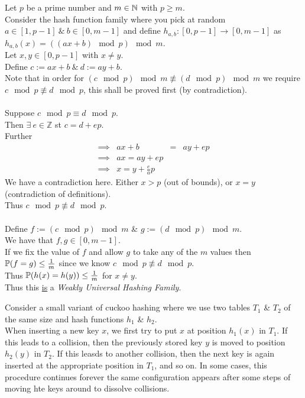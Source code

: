 \documentclass[11pt,a4paper]{article}
\begin{document}
\qpart
Let $p$ be a prime number and $m\in\mathbb{N}$ with $p\geq m$.\\
Consider the hash function family where you pick at random $a\in[1,p-1]\ \&\ b\in[0,m-1]$ and define $h_{a,b}:[0,p-1]\to[0,m-1]$ as $h_{a,b}(x)=((ax+b)\mod p)\mod m$.\\

\apart
Let $x,y\in[0,p-1]$ with $x\neq y$.\\
Define $c:=ax+b\ \&\ d:=ay+b$.\\
Note that in order for $(c\mod p)\mod m\not\equiv(d\mod p)\mod m$ we require ${c\mod p\not\equiv d\mod p}$, this shall be proved first (by contradiction).\\
\\
Suppose $c\mod p\equiv d\mod p$.\\
Then $\exists\ e\in\mathbb{Z}$ st $c=d+ep$.\\
Further
\[\begin{array}{rrcl}
\implies&ax+b&=&ay+ep\\
\implies&ax=ay+ep\\
\implies&x=y+\frac{e}{a}p
\end{array}\]
We have a contradiction here. Either $x>p$ (out of bounds), or $x=y$ (contradiction of definitions).\\
Thus $c\mod p\not\equiv d\mod p$.\\
\\
Define $f:=(c\mod p)\mod m$ \& $g:=(d\mod p)\mod m$.\\
We have that $f,g\in[0,m-1]$.\\
If we fix the value of $f$ and allow $g$ to take any of the $m$ values then $\mathbb{P}(f=g)\leq\frac1m$ since we know $c\mod p\not\equiv d\mod p$.\\
Thus $\mathbb{P}(h(x)=h(y))\leq\frac1m$ for $x\neq y$.\\
Thus this \underline{is} a \textit{Weakly Universal Hashing Family}.\proved

\question
Consider a small variant of cuckoo hashing where we use two tables $T_1$ \& $T_2$ of the same size and hash functions $h_1$ \& $h_2$.\\
When inserting a new key $x$, we first try to put $x$ at position $h_1(x)$ in $T_1$. If this leads to a collision, then the previously stored key $y$ is moved to position $h_2(y)$ in $T_2$. If this leasds to another collision, then the next key is again inserted at the appropriate position in $T_1$, and so on. In some cases, this procedure continues forever \ie the same configuration appears after some steps of moving hte keys around to dissolve collisions.\\
\end{document}
